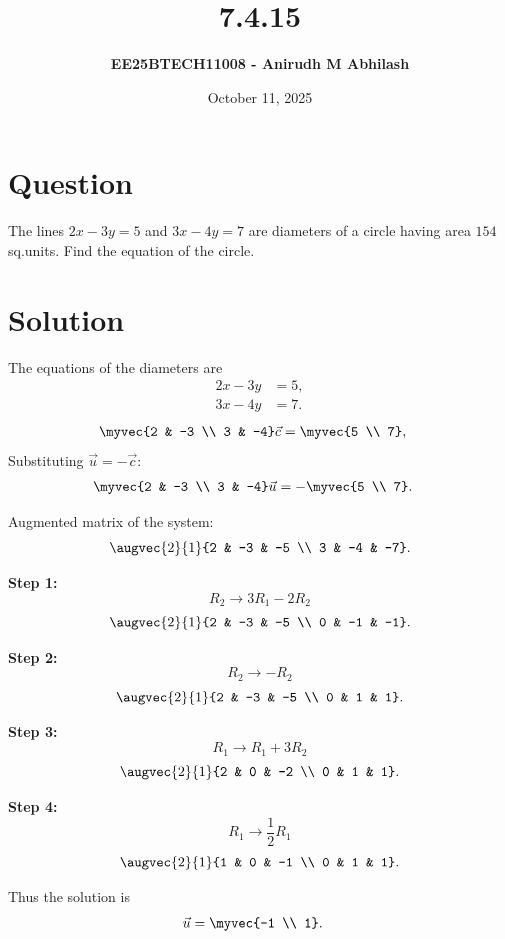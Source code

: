\documentclass[12pt]{article}
\title{\textbf{7.4.15}}
\author{\textbf{EE25BTECH11008 - Anirudh M Abhilash}}
\date{October 11, 2025}
\begin{document}
\maketitle

\section*{Question}

The lines $2x - 3y = 5$ and $3x - 4y = 7$ are diameters of a circle having area $154$ sq.units. Find the equation of the circle.

\section*{Solution}

The equations of the diameters are
\begin{align}
2x - 3y &= 5, \\
3x - 4y &= 7.
\end{align}
\begin{align}
\myvec{2 & -3 \\ 3 & -4}\vec{c} &= \myvec{5 \\ 7},
\end{align}
Substituting $\vec{u} = -\vec{c}$:
\begin{align}
\myvec{2 & -3 \\ 3 & -4}\vec{u} &= -\myvec{5 \\ 7}.
\end{align}

Augmented matrix of the system:
\[
\augvec{2}{1}{2 & -3 & -5 \\ 3 & -4 & -7}.
\]

\textbf{Step 1:}
\[
R_2 \to 3R_1 - 2R_2
\]
\[
\augvec{2}{1}{2 & -3 & -5 \\ 0 & -1 & -1}.
\]

\textbf{Step 2:}
\[
R_2 \to -R_2
\]
\[
\augvec{2}{1}{2 & -3 & -5 \\ 0 & 1 & 1}.
\]

\textbf{Step 3:}
\[
R_1 \to R_1 + 3R_2
\]
\[
\augvec{2}{1}{2 & 0 & -2 \\ 0 & 1 & 1}.
\]

\textbf{Step 4:}
\[
R_1 \to \frac{1}{2} R_1
\]
\[
\augvec{2}{1}{1 & 0 & -1 \\ 0 & 1 & 1}.
\]

Thus the solution is
\begin{align}
\vec{u} &= \myvec{-1 \\ 1}.
\end{align}
\end{document}
